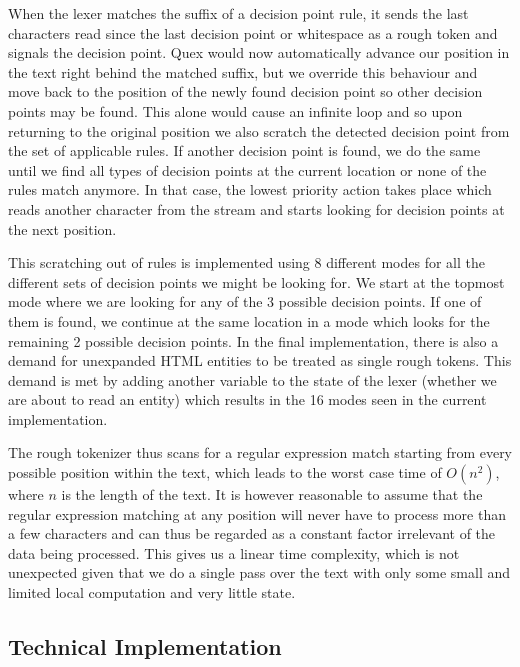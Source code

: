 When the lexer matches the suffix of a decision point rule, it sends the last
characters read since the last decision point or whitespace as a rough token
and signals the decision point. Quex would now automatically advance our
position in the text right behind the matched suffix, but we override this
behaviour and move back to the position of the newly found decision point so
other decision points may be found. This alone would cause an infinite loop and
so upon returning to the original position we also scratch the detected
decision point from the set of applicable rules. If another decision point is
found, we do the same until we find all types of decision points at the current
location or none of the rules match anymore. In that case, the lowest priority
action takes place which reads another character from the stream and starts
looking for decision points at the next position.

This scratching out of rules is implemented using 8 different modes for all the
different sets of decision points we might be looking for. We start at the
topmost mode where we are looking for any of the 3 possible decision points. If
one of them is found, we continue at the same location in a mode which looks
for the remaining 2 possible decision points. In the final implementation,
there is also a demand for unexpanded HTML entities to be treated as single
rough tokens. This demand is met by adding another variable to the state of
the lexer (whether we are about to read an entity) which results in the 16
modes seen in the current implementation.

The rough tokenizer thus scans for a regular expression match starting from
every possible position within the text, which leads to the worst case time of
$O(n^2)$, where $n$ is the length of the text. It is however reasonable to
assume that the regular expression matching at any position will never have to
process more than a few characters and can thus be regarded as a constant
factor irrelevant of the data being processed. This gives us a linear time
complexity, which is not unexpected given that we do a single pass over the
text with only some small and limited local computation and very little state.

\subsection{Technical Implementation}
\label{ssec:impl-roughtok-technical}

